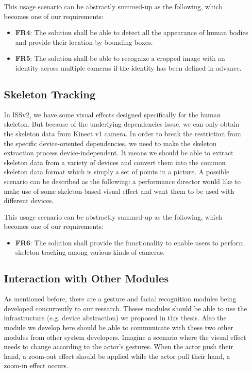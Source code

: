 This usage scenario can be abstractly summed-up as the following, which becomes
one of our requirements:

\begin{itemize}
    \item \textbf{FR4}: The solution shall be able to detect all the appearance 
    of human bodies and provide their location by bounding boxes.
    \item \textbf{FR5}: The solution shall be able to recognize a cropped image 
    with an identity across multiple cameras if the identity has been defined in 
    advance.
\end{itemize}

\subsection{Skeleton Tracking}
\label{sec:intro-sq-skt}

In ISSv2, we have some visual effects designed specifically for the human 
skeleton. But because of the underlying dependencies issue, we can only obtain 
the skeleton data from Kinect v1 camera.
In order to break the restriction from the specific device-oriented
dependencies, we need to make the skeleton extraction process 
device-independent.
It means we should be able to extract skeleton data from a variety
of devices and convert them into the common skeleton data format which is simply 
a set of points in a picture. A possible scenario can be described as the following: a
performance director would like to make use of some skeleton-based visual
effect and want them to be used with different devices.

This usage scenario can be abstractly summed-up as the following, which becomes
one of our requirements:

\begin{itemize}
    \item \textbf{FR6}: The solution shall provide the functionality to enable
    users to perform skeleton tracking among various kinds of cameras.
\end{itemize}

\subsection{Interaction with Other Modules}
\label{sec:intro-sq-inta}

As mentioned before, there are a gesture and facial recognition modules being developed
concurrently to our research. Theses modules should be able to use the infrastructure (e.g.
device abstraction) we proposed in this thesis. Also the module we develop here
should be able to communicate with these two other modules from other system
developers. Imagine a scenario where the visual effect needs to change according
to the actor's gestures. When the actor push their hand, a zoom-out
effect should be applied while the actor pull their hand, a zoom-in effect
occurs.

